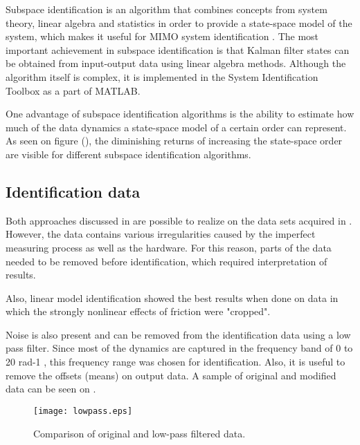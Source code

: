 Subspace identification is an algorithm that combines concepts from system theory, linear algebra and statistics in order to provide a state-space model of the system, which makes it useful for MIMO system identification \cite{van2012subspace}. 
The most important achievement in subspace identification is that Kalman filter states can be obtained from input-output data using linear algebra methods.
Although the algorithm itself is complex, it is implemented in the System Identification Toolbox as a part of MATLAB.

One advantage of subspace identification algorithms is the ability to estimate how much of the data dynamics a state-space model of a certain order can represent. 
As seen on figure (), the diminishing returns of increasing the state-space order are visible for different subspace identification algorithms.


\subsection{Identification data}

Both approaches discussed in  are possible to realize on the data sets acquired in .
However, the data contains various irregularities caused by the imperfect measuring process as well as the hardware. 
For this reason, parts of the data needed to be removed before identification, which required interpretation of results.

Also, linear model identification showed the best results when done on data in which the strongly nonlinear effects of friction were "cropped".

Noise is also present and can be removed from the identification data using a low pass filter.
Since most of the dynamics are captured in the frequency band of 0 to 20 rad-1 , this frequency range was chosen for identification.
Also, it is useful to remove the offsets (means) on output data.
A sample of original and modified data can be seen on .

\begin{figure}[H]
\centering
\texttt{[image: lowpass.eps]}
\caption{Comparison of original and low-pass filtered data.}
\label{figlowpass}
\end{figure}

